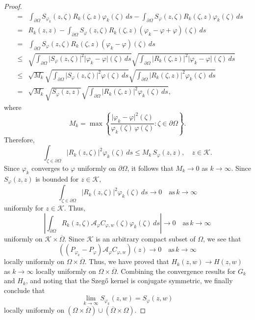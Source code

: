 \documentclass[11pt, reqno]{amsart}
\numberwithin{equation}{section}
\begin{document}
\begin{proof}
\begin{eqnarray*}
&=&
\int_{\partial\Omega} S_{\varphi_k}(z,\zeta) R_k(\zeta,z) \varphi_k(\zeta)\,ds
-
\int_{\partial\Omega} S_{\varphi}(z,\zeta) R_k(\zeta,z) \varphi_k(\zeta)\,ds\\
&=&
R_k(z,z)
-
\int_{\partial\Omega} S_{\varphi}(z,\zeta) R_k(\zeta,z) (\varphi_k-\varphi+\varphi)(\zeta)\,ds\\
&=&
\int_{\partial\Omega} S_{\varphi}(z,\zeta) R_k(\zeta,z) (\varphi_k-\varphi)(\zeta)\,ds\\
&\leq&
\sqrt{\int_{\partial\Omega} \vert S_{\varphi}(z,\zeta)\vert^2 \vert\varphi_k-\varphi\vert(\zeta)\,ds}
\sqrt{\int_{\partial\Omega} \vert R_k(\zeta,z)\vert^2 \vert\varphi_k-\varphi\vert(\zeta)\,ds}\\
&\leq&
\sqrt{M_k}
\sqrt{\int_{\partial\Omega} \vert S_{\varphi}(z,\zeta)\vert^2 \varphi(\zeta)\,ds}
\sqrt{\int_{\partial\Omega} \vert R_k(\zeta,z)\vert^2 \varphi_k(\zeta)\,ds}\\
&=&
\sqrt{M_k} \sqrt{S_{\varphi}(z,z)}
\sqrt{\int_{\partial\Omega} \vert R_k(\zeta,z)\vert^2 \varphi_k(\zeta)\,ds},
\end{eqnarray*}
where
\[
M_k=\max\left\lbrace \frac{\vert \varphi_k-\varphi\vert^2(\zeta)}{\varphi_k(\zeta)\,\varphi(\zeta)}: \zeta\in\partial\Omega\right\rbrace.
\]
Therefore,
\[
\int_{\zeta\in\partial\Omega} \vert R_k(z,\zeta)\vert^2 \varphi_k(\zeta)\,ds
\leq 
M_k\,
S_{\varphi}(z,z),\quad z\in\mathcal{K}.
\]
Since $\varphi_k$ converges to $\varphi$ uniformly on $\partial\Omega$, it follows that $M_k\rightarrow 0$ as $k\rightarrow\infty$. Since $S_{\varphi}(z,z)$ is bounded for $z\in \mathcal{K}$, 
\[
\int_{\zeta\in\partial\Omega} \vert R_k(z,\zeta)\vert^2 \varphi_k(\zeta)\,ds
\rightarrow 0 \quad \text{as}\,k\rightarrow\infty
\]
uniformly for $z\in\mathcal{K}$. Thus,
\[
\left\lvert
\int_{\partial\Omega} R_k(z,\zeta)\mathcal{A}_{\varphi} C_{\varphi,w}(\zeta) \varphi_k(\zeta)\,ds
\right\rvert
\rightarrow 0 
\quad \text{as}\,
k\rightarrow \infty
\]
uniformly on $\mathcal{K}\times\overline{\Omega}$. Since $\mathcal{K}$ is an arbitrary compact subset of $\Omega$, we see that
\[
((P_{\varphi_k}-P_{\varphi})\mathcal{A}_{\varphi} C_{\varphi,w})(z)\rightarrow 0
\quad
\text{as}\, k\rightarrow\infty
\]
locally uniformly on $\Omega\times\overline{\Omega}$. Thus, we have proved that $H_k(z,w)\rightarrow H(z,w)$ as $k\rightarrow\infty$ locally uniformly on $\Omega\times\overline{\Omega}$. Combining the convergence results for $G_k$ and $H_k$, and noting that the Szeg\H{o} kernel is conjugate symmetric, we finally conclude that
\[
\lim_{k\rightarrow\infty} S_{\varphi_k}(z,w)=S_{\varphi}(z,w)
\]
locally uniformly on $(\Omega\times\overline{\Omega})\cup (\overline{\Omega}\times\Omega)$.
\end{proof}
\end{document}
